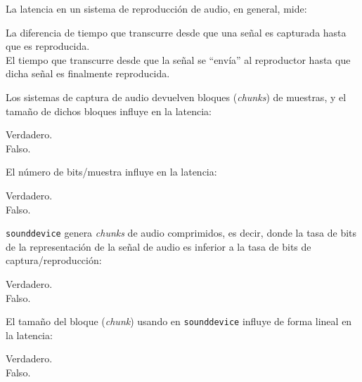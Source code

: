 \documentclass[legalpaper, 12pt, addpoints]{exam}
\begin{document}
\begin{questions}
\question La latencia en un sistema de reproducción de audio, en general, mide:

\begin{oneparchoices}
  \choice La diferencia de tiempo que transcurre desde que una señal es capturada hasta que es reproducida.\\
  \choice El tiempo que transcurre desde que la señal se ``envía'' al
  reproductor hasta que dicha señal es finalmente reproducida.
\end{oneparchoices}
  
\vspace{0.10in}

\question Los sistemas de captura de audio devuelven bloques (\emph{chunks})
de muestras, y el tamaño de dichos bloques influye en la latencia:

\begin{oneparchoices}
  \choice Verdadero.\\
  \choice Falso.
\end{oneparchoices}
  
\vspace{0.10in}

\question El número de bits/muestra influye en la latencia:

\begin{oneparchoices}
  \choice Verdadero.\\
  \choice Falso.
\end{oneparchoices}
  
\vspace{0.10in}

\question \texttt{sounddevice} genera \emph{chunks} de audio
comprimidos, es decir, donde la tasa de bits de la representación de
la señal de audio es inferior a la tasa de bits de
captura/reproducción:

\begin{oneparchoices}
  \choice Verdadero.\\
  \choice Falso.
\end{oneparchoices}
  
\vspace{0.10in}

\question El tamaño del bloque (\emph{chunk}) usando en \texttt{sounddevice}
influye de forma lineal en la latencia:

\begin{oneparchoices}
  \choice Verdadero.\\
  \choice Falso.
\end{oneparchoices}
  

\end{questions}
\end{document}
